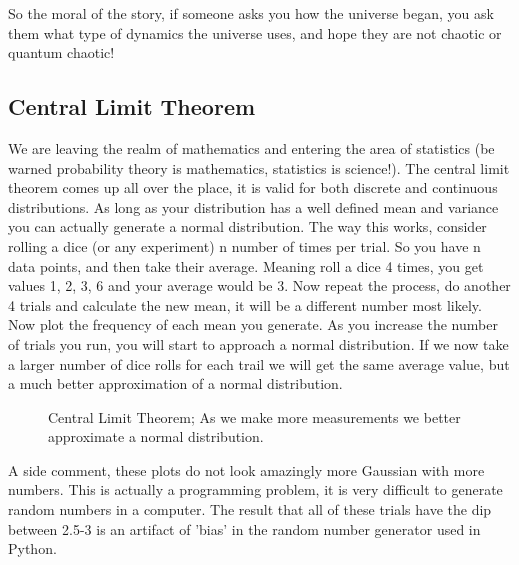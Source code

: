 \documentclass{article}
\begin{document}
So the moral of the story, if someone asks you how the universe began, you ask them what type of dynamics the universe uses, and hope they are not chaotic or quantum chaotic!


\subsection{Central Limit Theorem}
We are leaving the realm of mathematics and entering the area of statistics (be warned probability theory is mathematics, statistics is science!). 
The central limit theorem comes up all over the place, it is valid for both discrete and continuous distributions. 
As long as your distribution has a well defined mean and variance you can actually generate a normal distribution. 
The way this works, consider rolling a dice (or any experiment) n number of times per trial. 
So you have n data points, and then take their average. 
Meaning roll a dice 4 times, you get values 1, 2, 3, 6 and your average would be 3. 
Now repeat the process, do another 4 trials and calculate the new mean, it will be a different number most likely. 
Now plot the frequency of each mean you generate. 
As you increase the number of trials you run, you will start to approach a normal distribution. 
If we now take a larger number of dice rolls for each trail we will get the same average value, but a much better approximation of a normal distribution. 

\begin{figure}[h!]
\caption{Central Limit Theorem; As we make more measurements we better approximate a normal distribution.}
\end{figure}
A side comment, these plots do not look amazingly more Gaussian with more numbers. 
This is actually a programming problem, it is very difficult to generate random numbers in a computer.
The result that all of these trials have the dip between 2.5-3 is an artifact of 'bias' in the random number generator used in Python. 
\end{document}
